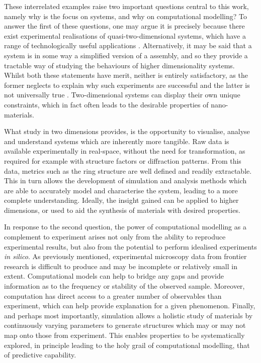 These interrelated examples raise two important questions central to this work, namely why is the focus on \td{} systems, and why on computational modelling?
To answer the first of these questions, one may argue it is precisely because there exist experimental realisations of quasi\--two\--dimensional systems, which have a range of technologically useful applications \cite{Butler2013,Bhimanapati2015,Tan2017}.
Alternatively, it may be said that a \td{} system is in some way a simplified version of a \thd{} assembly, and so they provide a tractable way of studying the behaviours of higher dimensionality systems.
Whilst both these statements have merit, neither is entirely satisfactory, as the former neglects to explain why such experiments are successful and the latter is not universally true \cite{ChaikinPaulM1995}.
Two\--dimensional systems can display their own unique constraints, which in fact often leads to the desirable properties of nano\--materials.

What study in two dimensions provides, is the opportunity to visualise, analyse and understand systems which are inherently more tangible.
Raw data is available experimentally in real\--space, without the need for transformation, as required for example with structure factors or diffraction patterns.
From this data, metrics such as the ring structure are well defined and readily extractable.
This in turn allows the development of simulation and analysis methods which are able to accurately model and characterise the system, leading to a more complete understanding.
Ideally, the insight gained can be applied to higher dimensions, or used to aid the synthesis of materials with desired properties.

In response to the second question, the power of computational modelling as a  complement to experiment arises not only from the ability to reproduce experimental results, but also from the potential to perform idealised experiments \textit{in silico}.%
As previously mentioned, experimental microscopy data from frontier research is difficult to produce and may be incomplete or relatively small in extent.
Computational models can help to bridge any gaps and provide information as to the frequency or stability of the observed sample.
Moreover, computation has direct access to a greater number of observables than experiment, which can help provide explanation for a given phenomenon.
Finally, and perhaps most importantly, simulation allows a holistic study of materials by continuously varying parameters to generate structures which may or may not map onto those from experiment.
This enables properties to be systematically explored, in principle leading to the holy grail of computational modelling, that of predictive capability.

